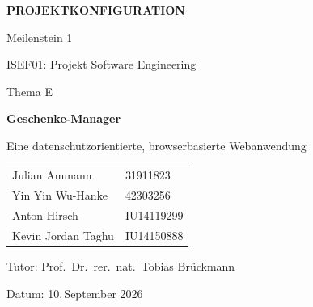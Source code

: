\documentclass[11pt,a4paper]{article}
\begin{document}
\begin{titlepage}
\thispagestyle{empty}
\centering
\vspace*{2.5cm}

{\Huge\bfseries PROJEKTKONFIGURATION\par}
\vspace{0.6cm}
{\Large Meilenstein 1\par}
\vspace{1.2cm}

{\Large ISEF01: Projekt Software Engineering\par}
\vspace{1.5cm}

{\large Thema E\par}
\vspace{0.2cm}
{\Large\bfseries Geschenke-Manager\par}
\vspace{0.3cm}
{\large Eine datenschutzorientierte, browserbasierte Webanwendung\par}

\vfill

{\large
\begin{tabular}{@{}ll@{}}
Julian Ammann & 31911823 \\
Yin Yin Wu-Hanke & 42303256 \\
Anton Hirsch & IU14119299 \\
Kevin Jordan Taghu & IU14150888 \\
\end{tabular}\par}

\vspace{1.0cm}
{\large
Tutor: Prof.\ Dr.\ rer.\ nat.\ Tobias Brückmann\par
Datum: 10.\,September 2026 %
\par}

\end{titlepage}

\setcounter{page}{1}

\tableofcontents

\clearpage
{}
\listoffigures

\clearpage
{}

\end{document}
